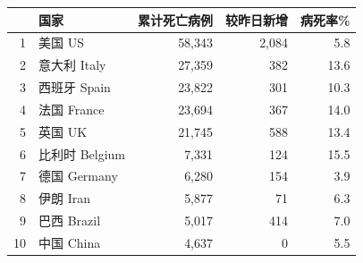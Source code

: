 \documentclass[]{article}
\begin{document}
\begin{table}[H]
\begin{minipage}{.6\linewidth}
\begin{table}[H]
\begin{tabular}{rlrrr}
\toprule
  & 国家 & 累计死亡病例 & 较昨日新增 & 病死率\%\\
\midrule
\rowcolor{gray!6}  1 & 美国 US & 58,343 & 2,084 & 5.8\\
2 & 意大利 Italy & 27,359 & 382 & 13.6\\
\rowcolor{gray!6}  3 & 西班牙 Spain & 23,822 & 301 & 10.3\\
4 & 法国 France & 23,694 & 367 & 14.0\\
\rowcolor{gray!6}  5 & 英国 UK & 21,745 & 588 & 13.4\\
6 & 比利时 Belgium & 7,331 & 124 & 15.5\\
\rowcolor{gray!6}  7 & 德国 Germany & 6,280 & 154 & 3.9\\
8 & 伊朗 Iran & 5,877 & 71 & 6.3\\
\rowcolor{gray!6}  9 & 巴西 Brazil & 5,017 & 414 & 7.0\\
10 & 中国 China & 4,637 & 0 & 5.5\\
\bottomrule
\end{tabular}
\endgroup{}
\end{table} \end{minipage} 
\end{table}
\end{document}
